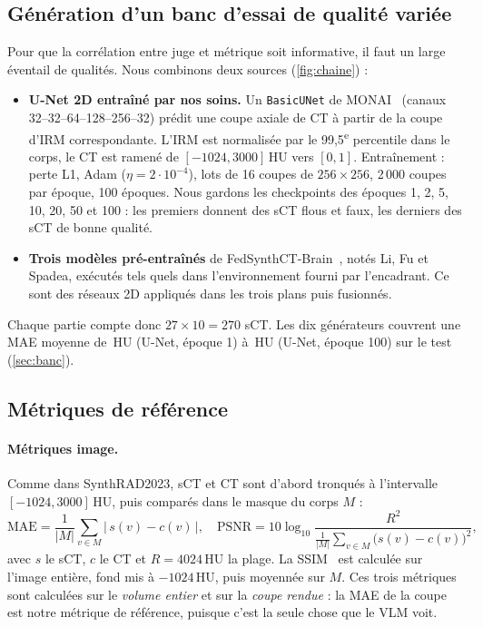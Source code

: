 \documentclass[11pt,a4paper]{article}
\begin{document}
\subsection{Génération d'un banc d'essai de qualité variée}
\label{sec:generation}
Pour que la corrélation entre juge et métrique soit informative, il faut un large éventail de qualités. Nous combinons deux sources (\cref{fig:chaine}) :
\begin{itemize}
  \item \textbf{U-Net 2D entraîné par nos soins.} Un \texttt{BasicUNet} de MONAI~\cite{ronneberger2015unet,cardoso2022monai} (canaux 32--32--64--128--256--32) prédit une coupe axiale de CT à partir de la coupe d'IRM correspondante. L'IRM est normalisée par le 99,5\textsuperscript{e} percentile dans le corps, le CT est ramené de $[-1024, 3000]$\,HU vers $[0,1]$. Entraînement : perte L1, Adam ($\eta = 2\cdot10^{-4}$), lots de 16 coupes de $256\times256$, 2\,000 coupes par époque, 100 époques. Nous gardons les checkpoints des époques 1, 2, 5, 10, 20, 50 et 100 : les premiers donnent des sCT flous et faux, les derniers des sCT de bonne qualité.
  \item \textbf{Trois modèles pré-entraînés} de FedSynthCT-Brain~\cite{raggio2025fedsynth,smc}, notés Li, Fu et Spadea, exécutés tels quels dans l'environnement fourni par l'encadrant. Ce sont des réseaux 2D appliqués dans les trois plans puis fusionnés.
\end{itemize}
Chaque partie compte donc $27 \times 10 = 270$ sCT. Les dix générateurs couvrent une MAE moyenne de \maeEpOne{}\,HU (U-Net, époque 1) à \maeEpHundred{}\,HU (U-Net, époque 100) sur le test (\cref{sec:banc}).

\subsection{Métriques de référence}
\label{sec:metriques}
\paragraph{Métriques image.} Comme dans SynthRAD2023, sCT et CT sont d'abord tronqués à l'intervalle $[-1024, 3000]$\,HU, puis comparés dans le masque du corps $M$ :
\begin{equation}
\mathrm{MAE} = \frac{1}{|M|}\sum_{v\in M}\bigl|\,s(v)-c(v)\,\bigr|,\quad
\mathrm{PSNR} = 10\log_{10}\frac{R^2}{\frac{1}{|M|}\sum_{v\in M}\bigl(s(v)-c(v)\bigr)^2},
\label{eq:mae}
\end{equation}
avec $s$ le sCT, $c$ le CT et $R = 4024$\,HU la plage. La SSIM~\cite{wang2004ssim} est calculée sur l'image entière, fond mis à $-1024$\,HU, puis moyennée sur $M$. Ces trois métriques sont calculées sur le \emph{volume entier} et sur la \emph{coupe rendue} : la MAE de la coupe est notre métrique de référence, puisque c'est la seule chose que le VLM voit.
\end{document}
